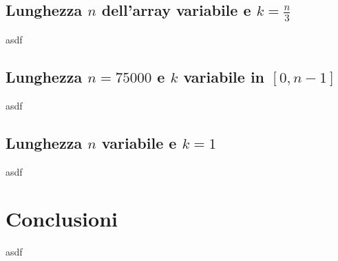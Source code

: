 \documentclass{article}
\begin{document}
	
	\subsection{Lunghezza $n$ dell'array variabile e $k=\frac{n}{3}$}
	asdf
	\newpage
	
	
	\subsection{Lunghezza $n=75000$ e $k$ variabile in $[0,n-1]$}
	asdf
	\newpage
	
	
	\subsection{Lunghezza $n$ variabile e $k=1$}
	asdf
	\newpage


	\section{Conclusioni}
	asdf
\end{document}
